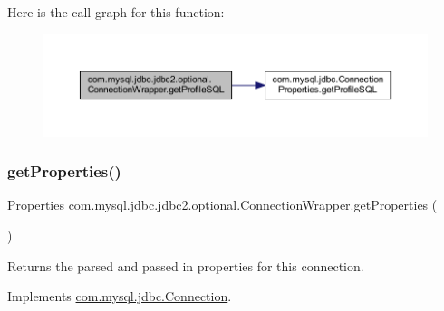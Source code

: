 Here is the call graph for this function\+:
\nopagebreak
\begin{figure}[H]
\begin{center}
\leavevmode
\includegraphics[width=350pt]{classcom_1_1mysql_1_1jdbc_1_1jdbc2_1_1optional_1_1_connection_wrapper_a2e1b1b2b6690b7b02510266fc541f86f_cgraph}
\end{center}
\end{figure}
\mbox{\label{classcom_1_1mysql_1_1jdbc_1_1jdbc2_1_1optional_1_1_connection_wrapper_a5f9c13aa2ff933d03836b6217c781fd7}} 
\subsubsection{\texorpdfstring{get\+Properties()}{getProperties()}}
{\footnotesize\ttfamily Properties com.\+mysql.\+jdbc.\+jdbc2.\+optional.\+Connection\+Wrapper.\+get\+Properties (\begin{DoxyParamCaption}{ }\end{DoxyParamCaption})}

Returns the parsed and passed in properties for this connection. 

Implements \mbox{\hyperlink{interfacecom_1_1mysql_1_1jdbc_1_1_connection_ad594d416be84166aff54270aa66b3d71}{com.\+mysql.\+jdbc.\+Connection}}.

